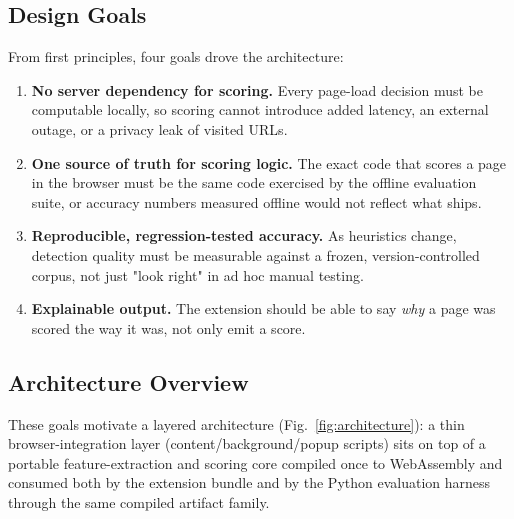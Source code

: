 \documentclass[conference]{IEEEtran}
\begin{document}
\subsection{Design Goals}
From first principles, four goals drove the architecture:
\begin{enumerate}
  \item \textbf{No server dependency for scoring.} Every page-load decision must be computable locally, so scoring cannot introduce added latency, an external outage, or a privacy leak of visited URLs.
  \item \textbf{One source of truth for scoring logic.} The exact code that scores a page in the browser must be the same code exercised by the offline evaluation suite, or accuracy numbers measured offline would not reflect what ships.
  \item \textbf{Reproducible, regression-tested accuracy.} As heuristics change, detection quality must be measurable against a frozen, version-controlled corpus, not just "look right" in ad hoc manual testing.
  \item \textbf{Explainable output.} The extension should be able to say \emph{why} a page was scored the way it was, not only emit a score.
  \end{enumerate}

\subsection{Architecture Overview}
These goals motivate a layered architecture (Fig.~\ref{fig:architecture}): a thin browser-integration layer (content/background/popup scripts) sits on top of a portable feature-extraction and scoring core compiled once to WebAssembly and consumed both by the extension bundle and by the Python evaluation harness through the same compiled artifact family.
\end{document}

